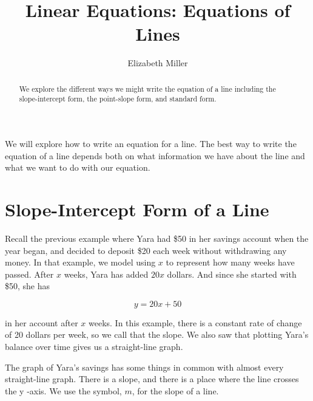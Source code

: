 \documentclass[nooutcomes]{ximera}
\author{Elizabeth Miller}
\title{Linear Equations: Equations of Lines}
\begin{document}
\begin{abstract}
  We explore the different ways we might write the equation of a line including the slope-intercept form, the point-slope form, and standard form.
\end{abstract}
\licenseORCCA
\maketitle

We will explore how to write an equation for a line.  The best way to write the equation of a line depends both on what information we have about the line and what we want to do with our equation.  



\section{Slope-Intercept Form of a Line}

Recall the previous example where Yara had \$50 in her savings account when the year began, and decided to deposit \$20 each week without withdrawing any money. In that example, we model using $x$ to represent how many weeks have passed. After $x$  weeks, Yara has added $20x$ dollars. And since she started with \$50,  she has

$$y=20x+50$$ 

in her account after $x$ weeks. In this example, there is a constant rate of change of 20 dollars per week, so we call that the slope. We also saw that plotting Yara's balance over time gives us a straight-line graph.

\begin{image}
\end{image}

The graph of Yara's savings has some things in common with almost every straight-line graph. There is a slope, and there is a place where the line crosses the 
y
-axis. We use the symbol, $m$, for the slope of a line. 
\end{document}
